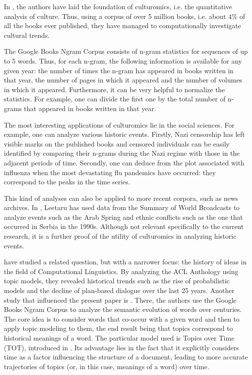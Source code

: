 
In , the authors have laid the foundation of culturomics, i.e. the quantitative analysis of culture. Thus, using a corpus of over 5 million books, i.e. about $4 \%$ of all the books ever published, they have managed to computationally investigate cultural trends.

The Google Books Ngram Corpus consists of n-gram statistics for sequences of up to 5 words. Thus, for each n-gram, the following information is available for any given year: the number of times the n-gram has appeared in books written in that year, the number of pages in which it appeared and the number of volumes in which it appeared. Furthermore, it can be very helpful to normalize the statistics. For example, one can divide the first one by the total number of n-grams that appeared in books written in that year.

The most interesting applications of culturomics lie in the social sciences. For example, one can analyze various historic events. Firstly, Nazi censorship has left visible marks on the published books and censored individuals can be easily identified by comparing their n-grams during the Nazi regime with those in the adjacent periods of time. Secondly, one can deduce from the plot associated with influenza when the most devastating flu pandemics have occurred: they correspond to the peaks in the time series.

This kind of analyses can also be applied to more recent corpora, such as news archives. In , Leetaru has used data from the Summary of World Broadcasts to analyze events such as the Arab Spring and ethnic conflicts such as the one that occurred in Serbia in the 1990s. Although not relevant specifically to the current research, it is a further proof of the utility of culturomics in analyzing historic events.

 have studied a related question, but with a narrower focus: the history of ideas in the field of Computational Linguistics. By analyzing the ACL Anthology using topic models, they revealed historical trends such as the rise of probabilistic models and the decline of plan-based dialogue over the last 25 years. Another study that influenced the present paper is . There, the authors use the Google Books Ngram Corpus to analyze the semantic evolution of words over centuries. The core idea is to consider words that co-occur with a given word and then to apply topic modeling to them, the end result being that topics correspond to historical meanings of a word. The particular model used is Topics over Time (TOT), introduced in . Its advantage lies in the fact that it explicitly considers time as a factor influencing the structure of a document, leading to more accurate trajectories of topics (or, in this case, meanings of a word) over time.
